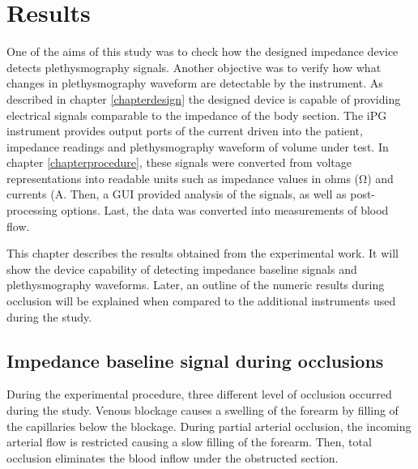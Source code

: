 
\chapter{Results}  %
\label{chapterresults}

\ifpdf
\graphicspath{{Chapter5/Figs/Raster/}{Chapter5/Figs/PDF/}{Chapter5/Figs/}}
\else
\graphicspath{{Chapter5/Figs/Vector/}{Chapter5/Figs/}}
\fi

One of the aims of this study was to check how the designed impedance device detects plethysmography signals. Another objective was to verify how what changes in plethysmography waveform are detectable by the instrument. As described in chapter \ref{chapterdesign} the designed device is capable of providing electrical signals comparable to the impedance of the body section. The iPG instrument provides output ports of the current driven into the patient, impedance readings and plethysmography waveform of volume under test. In chapter \ref{chapterprocedure}, these signals were converted from voltage representations into readable units such as impedance values in ohms (\si{\ohm}) and currents (\si{\ampere}. Then, a GUI provided analysis of the signals, as well as post-processing options. Last, the data was converted into measurements of blood flow.


This chapter describes the results obtained from the experimental work. It will show the device capability of detecting impedance baseline signals and plethysmography waveforms. Later, an outline of the numeric results during occlusion will be explained when compared to the additional instruments used during the study. 

\section{Impedance baseline signal during occlusions}
\label{section5.1}
During the experimental procedure, three different level of occlusion occurred during the study. Venous blockage causes a swelling of the forearm by filling of the capillaries below the blockage. During partial arterial occlusion, the incoming arterial flow is restricted causing a slow filling of the forearm. Then, total occlusion eliminates the blood inflow under the obstructed section. 

